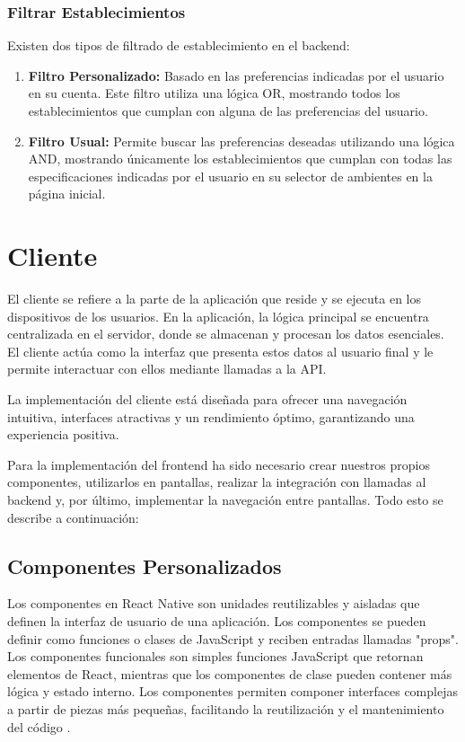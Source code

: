 \subsubsection{Filtrar Establecimientos}

Existen dos tipos de filtrado de establecimiento en el backend:

\begin{enumerate}
    \item \textbf{Filtro Personalizado: } Basado en las preferencias indicadas por el usuario en su cuenta. Este filtro utiliza una lógica OR, mostrando todos los establecimientos que cumplan con alguna de las preferencias del usuario.
    \item \textbf{Filtro Usual: } Permite buscar las preferencias deseadas utilizando una lógica AND, mostrando únicamente los establecimientos que cumplan con todas las especificaciones indicadas por el usuario en su selector de ambientes en la página inicial.
\end{enumerate}

\section{Cliente}

El cliente se refiere a la parte de la aplicación que reside y se ejecuta en los dispositivos de los usuarios. En la aplicación, la lógica principal se encuentra centralizada en el servidor, donde se almacenan y procesan los datos esenciales. El cliente actúa como la interfaz que presenta estos datos al usuario final y le permite interactuar con ellos mediante llamadas a la API.

La implementación del cliente está diseñada para ofrecer una navegación intuitiva, interfaces atractivas y un rendimiento óptimo, garantizando una experiencia positiva.

Para la implementación del frontend ha sido necesario crear nuestros propios componentes, utilizarlos en pantallas, realizar la integración con llamadas al backend y, por último, implementar la navegación entre pantallas. Todo esto se describe a continuación:

\subsection{Componentes Personalizados}

Los componentes en React Native son unidades reutilizables y aisladas que definen la interfaz de usuario de una aplicación. Los componentes se pueden definir como funciones o clases de JavaScript y reciben entradas llamadas "props". Los componentes funcionales son simples funciones JavaScript que retornan elementos de React, mientras que los componentes de clase pueden contener más lógica y estado interno. Los componentes permiten componer interfaces complejas a partir de piezas más pequeñas, facilitando la reutilización y el mantenimiento del código \cite{react}.

